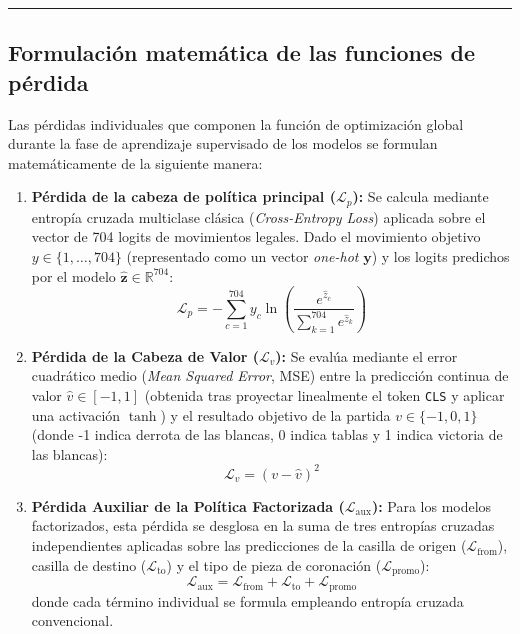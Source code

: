 \documentclass[12pt, a4paper]{article}
\begin{document}
\rule{\textwidth}{0.2pt}
\subsection{Formulación matemática de las funciones de pérdida}\label{sec:anexo_loss_details}

Las pérdidas individuales que componen la función de optimización global durante la fase de aprendizaje supervisado de los modelos se formulan matemáticamente de la siguiente manera:

\begin{enumerate}
    \item \textbf{Pérdida de la cabeza de política principal ($\mathcal{L}_p$):} Se calcula mediante entropía cruzada multiclase clásica (\textit{Cross-Entropy Loss}) aplicada sobre el vector de 704 logits de movimientos legales. Dado el movimiento objetivo $y \in \{1, \dots, 704\}$ (representado como un vector \textit{one-hot} $\mathbf{y}$) y los logits predichos por el modelo $\hat{\mathbf{z}} \in \mathbb{R}^{704}$:
    \begin{equation}
        \mathcal{L}_p = -\sum_{c=1}^{704} y_c \ln\left( \frac{e^{\hat{z}_c}}{\sum_{k=1}^{704} e^{\hat{z}_k}} \right)
    \end{equation}

    \item \textbf{Pérdida de la Cabeza de Valor ($\mathcal{L}_v$):} Se evalúa mediante el error cuadrático medio (\textit{Mean Squared Error}, MSE) entre la predicción continua de valor $\hat{v} \in [-1, 1]$ (obtenida tras proyectar linealmente el token \texttt{CLS} y aplicar una activación $\tanh$) y el resultado objetivo de la partida $v \in \{-1, 0, 1\}$ (donde -1 indica derrota de las blancas, 0 indica tablas y 1 indica victoria de las blancas):
    \begin{equation}
        \mathcal{L}_v = (v - \hat{v})^2
    \end{equation}

    \item \textbf{Pérdida Auxiliar de la Política Factorizada ($\mathcal{L}_{\text{aux}}$):} Para los modelos factorizados, esta pérdida se desglosa en la suma de tres entropías cruzadas independientes aplicadas sobre las predicciones de la casilla de origen ($\mathcal{L}_{\text{from}}$), casilla de destino ($\mathcal{L}_{\text{to}}$) y el tipo de pieza de coronación ($\mathcal{L}_{\text{promo}}$):
    \begin{equation}
        \mathcal{L}_{\text{aux}} = \mathcal{L}_{\text{from}} + \mathcal{L}_{\text{to}} + \mathcal{L}_{\text{promo}}
    \end{equation}
    donde cada término individual se formula empleando entropía cruzada convencional.
\end{enumerate}
\end{document}
